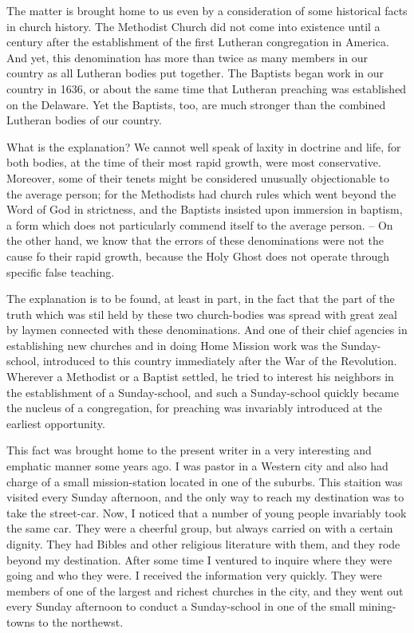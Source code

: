 \documentclass[
]{book}
\begin{document}
The matter is brought home to us even by a consideration of some historical facts in church history. The Methodist Church did not come into existence until a century after the establishment of the first Lutheran congregation in America. And yet, this denomination has more than twice as many members in our country as all Lutheran bodies put together. The Baptists began work in our country in 1636, or about the same time that Lutheran preaching was established on the Delaware. Yet the Baptists, too, are much stronger than the combined Lutheran bodies of our country.

What is the explanation? We cannot well speak of laxity in doctrine and life, for both bodies, at the time of their most rapid growth, were most conservative. Moreover, some of their tenets might be considered unusually objectionable to the average person; for the Methodists had church rules which went beyond the Word of God in strictness, and the Baptists insisted upon immersion in baptism, a form which does not particularly commend itself to the average person. -- On the other hand, we know that the errors of these denominations were not the cause fo their rapid growth, because the Holy Ghost does not operate through specific false teaching.

The explanation is to be found, at least in part, in the fact that the part of the truth which was stil held by these two church-bodies was spread with great zeal by laymen connected with these denominations. And one of their chief agencies in establishing new churches and in doing Home Mission work was the Sunday-school, introduced to this country immediately after the War of the Revolution. Wherever a Methodist or a Baptist settled, he tried to interest his neighbors in the establishment of a Sunday-school, and such a Sunday-school quickly became the nucleus of a congregation, for preaching was invariably introduced at the earliest opportunity.

This fact was brought home to the present writer in a very interesting and emphatic manner some years ago. I was pastor in a Western city and also had charge of a small mission-station located in one of the suburbs. This staition was visited every Sunday afternoon, and the only way to reach my destination was to take the street-car. Now, I noticed that a number of young people invariably took the same car. They were a cheerful group, but always carried on with a certain dignity. They had Bibles and other religious literature with them, and they rode beyond my destination. After some time I ventured to inquire where they were going and who they were. I received the information very quickly. They were members of one of the largest and richest churches in the city, and they went out every Sunday afternoon to conduct a Sunday-school in one of the small mining-towns to the northewst.
\end{document}
